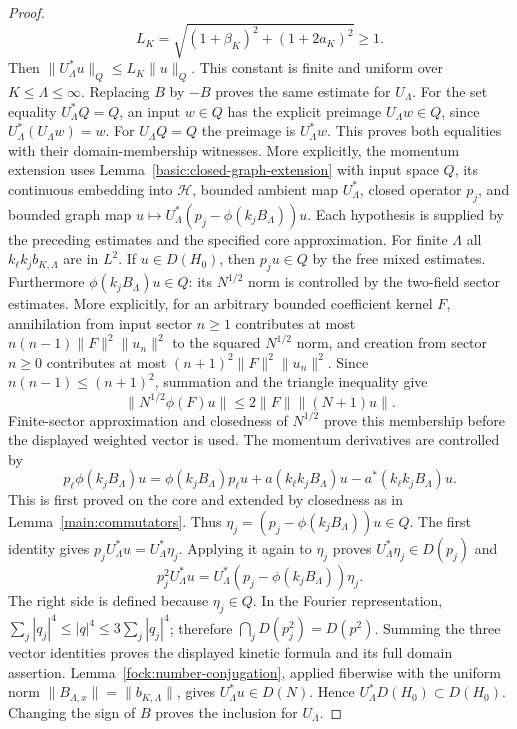 \documentclass[11pt,a4paper]{article}
\theoremstyle{definition}
\theoremstyle{remark}
\begin{document}
\begin{proof}
\[
 L_K=\sqrt{(1+\beta_K)^2+(1+2a_K)^2}\geq1.
\]
Then $\|U_\Lambda^*u\|_Q\leq L_K\|u\|_Q$. This constant
is finite and uniform over $K\leq\Lambda\leq\infty$.
Replacing $B$ by $-B$ proves the same estimate for $U_\Lambda$.
For the set equality $U_\Lambda^*Q=Q$, an input $w\in Q$ has
the explicit preimage $U_\Lambda w\in Q$, since
$U_\Lambda^*(U_\Lambda w)=w$. For $U_\Lambda Q=Q$ the
preimage is $U_\Lambda^*w$. This proves both equalities with
their domain-membership witnesses.
More explicitly, the momentum extension uses
Lemma~\ref{basic:closed-graph-extension} with input space $Q$,
its continuous embedding into $\mathcal H$, bounded ambient map
$U_\Lambda^*$, closed operator $p_j$, and bounded graph map
$u\mapsto U_\Lambda^*(p_j-\phi(k_jB_\Lambda))u$.
Each hypothesis is supplied by the preceding estimates and the
specified core approximation.
For finite $\Lambda$ all $k_\ell k_jb_{K,\Lambda}$ are in $L^2$.
If $u\in D(H_0)$, then $p_ju\in Q$ by the free mixed estimates.
Furthermore $\phi(k_jB_\Lambda)u\in Q$: its $N^{1/2}$ norm is
controlled by the two-field sector estimates. More explicitly, for
an arbitrary bounded coefficient kernel $F$, annihilation from
input sector $n\geq1$ contributes at most
$n(n-1)\|F\|^2\|u_n\|^2$ to the squared $N^{1/2}$ norm,
and creation from sector $n\geq0$ contributes at most
$(n+1)^2\|F\|^2\|u_n\|^2$. Since
$n(n-1)\leq(n+1)^2$, summation and the triangle inequality give
\[
 \|N^{1/2}\phi(F)u\|
       \leq2\|F\|\|(N+1)u\|.
\]
Finite-sector approximation and closedness of $N^{1/2}$ prove
this membership before the displayed weighted vector is used.
The momentum
derivatives are controlled by
\[
 p_\ell\phi(k_jB_\Lambda)u
 =\phi(k_jB_\Lambda)p_\ell u
       +a(k_\ell k_jB_\Lambda)u-a^*(k_\ell k_jB_\Lambda)u.
\]
This is first proved on the core and extended by closedness as in
Lemma~\ref{main:commutators}. Thus
$\eta_j=(p_j-\phi(k_jB_\Lambda))u\in Q$. The first identity gives
$p_jU_\Lambda^*u=U_\Lambda^*\eta_j$. Applying it again to
$\eta_j$ proves $U_\Lambda^*\eta_j\in D(p_j)$ and
\[
 p_j^2U_\Lambda^*u
   =U_\Lambda^*(p_j-\phi(k_jB_\Lambda))\eta_j.
\]
The right side is defined because $\eta_j\in Q$. In the Fourier
representation, $\sum_j|q_j|^4\leq|q|^4\leq3\sum_j|q_j|^4$;
therefore $\bigcap_jD(p_j^2)=D(p^2)$. Summing the three vector
identities proves the displayed kinetic formula and its full domain
assertion. Lemma~\ref{fock:number-conjugation}, applied fiberwise
with the uniform norm $\|B_{\Lambda,x}\|=\|b_{K,\Lambda}\|$, gives
$U_\Lambda^*u\in D(N)$. Hence $U_\Lambda^*D(H_0)\subset D(H_0)$.
Changing the sign of $B$ proves the inclusion for $U_\Lambda$.

\end{proof}
\end{document}
